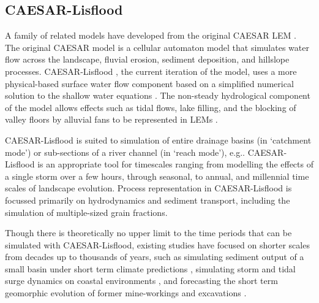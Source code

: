 \subsection{CAESAR-Lisflood}
A family of related models have developed from the original CAESAR LEM \citep{coulthard1996cellular,coulthard2002cellular}. The original CAESAR model is a cellular automaton model that simulates water flow across the landscape, fluvial erosion, sediment deposition, and hillslope processes. CAESAR-Lisflood \citep{Coulthard2013}, the current iteration of the model, uses a more physical-based surface water flow component based on a simplified numerical solution to the shallow water equations \citep[LISFLOOD-FP][]{bates2010simple}. The non-steady hydrological component of the model allows effects such as tidal flows, lake filling, and the blocking of valley floors by alluvial fans to be represented in LEMs \citep{Coulthard2013}. 

CAESAR-Lisflood is suited to simulation of entire drainage basins (in `catchment mode') or sub-sections of a river channel (in `reach mode'), e.g.\citet{Coulthard2006,van2007embedding}. CAESAR-Lisflood is an appropriate tool for timescales ranging from modelling the effects of a single storm over a few hours, through seasonal, to annual, and millennial time scales of landscape evolution. Process representation in CAESAR-Lisflood is focussed primarily on hydrodynamics and sediment transport, including the simulation of multiple-sized grain fractions. 

Though there is theoretically no upper limit to the time periods that can be simulated with CAESAR-Lisflood, existing studies have focused on shorter scales from decades up to thousands of years, such as simulating sediment output of a small basin under short term climate predictions \citep{Coulthard2012a}, simulating storm and tidal surge dynamics on coastal environments \citep{Skinner2015}, and forecasting the short term geomorphic evolution of former mine-workings and excavations \citep{pasculli2015cellular}.

